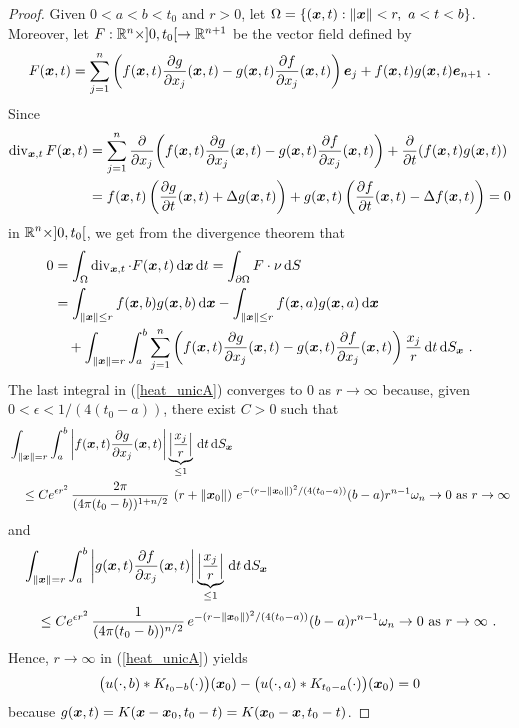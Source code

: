 \begin{proof}
Given $0< a < b < t_0$ and $r>0$, let
$\displaystyle \Omega =
\left\{ (\VEC{x},t) : \|\VEC{x}\| < r, \ a<t<b \right\}$.
Moreover, let $F:\RR^n \times ]0,t_0[ \to \RR^{n+1}$ be the vector
field defined by
\[
F(\VEC{x},t) = \sum_{j=1}^n
\left( f(\VEC{x},t) \pdydx{g}{x_j}(\VEC{x},t) - g(\VEC{x},t)
\pdydx{f}{x_j}(\VEC{x},t) \right) \VEC{e}_j
+ f(\VEC{x},t)g(\VEC{x},t) \VEC{e}_{n+1} \ .
\]
Since
\begin{align*}
\diV_{\VEC{x},t} F(\VEC{x},t)
&= \sum_{j=1}^n \pdfdx{
\left( f(\VEC{x},t) \pdydx{g}{x_j}(\VEC{x},t) - g(\VEC{x},t)
\pdydx{f}{x_j}(\VEC{x},t) \right) }{x_j}
+ \pdfdx{ \left(f(\VEC{x},t)g(\VEC{x},t)\right) }{t} \\
&= 
f(\VEC{x},t) \left( \pdydx{g}{t}(\VEC{x},t) + \Delta g(\VEC{x},t) \right)
+ g(\VEC{x},t) \left( \pdydx{f}{t}(\VEC{x},t) - \Delta f(\VEC{x},t) \right)
= 0
\end{align*}
in $\displaystyle \RR^n \times ]0,t_0[$, we get from the divergence theorem that
\begin{equation} \label{heat_unicA}
\begin{split}
0 &= \int_{\Omega} \diV_{\VEC{x},t}\cdot F(\VEC{x},t) \dx{\VEC{x}}\dx{t} 
= \int_{\partial \Omega} F \cdot \nu \dx{S} \\
&= \int_{\|\VEC{x}\|\leq r} f(\VEC{x},b)g(\VEC{x},b) \dx{\VEC{x}}
- \int_{\|\VEC{x}\|\leq r} f(\VEC{x},a)g(\VEC{x},a) \dx{\VEC{x}} \\
&\quad + \int_{\|\VEC{x}\|=r} \int_a^b
\sum_{j=1}^n \left( f(\VEC{x},t) \pdydx{g}{x_j}(\VEC{x},t) - g(\VEC{x},t)
\pdydx{f}{x_j}(\VEC{x},t) \right) \frac{x_j}{r} \dx{t}\dx{S_{\VEC{x}}} \ .
\end{split}
\end{equation}
The last integral in (\ref{heat_unicA}) converges to $0$ as
$r\to \infty$ because, given $0 < \epsilon < 1/(4(t_0-a))$, there
exist $C>0$ such that
\begin{align*}
&\int_{\|\VEC{x}\|=r} \int_a^b
\left| f(\VEC{x},t) \pdydx{g}{x_j}(\VEC{x},t) \right|
\underbrace{\left|\frac{x_j}{r}\right|}_{\leq 1} \dx{t}\dx{S_{\VEC{x}}} \\
& \quad
\leq C e^{\epsilon r^2}\, \frac{2\pi}{(4\pi (t_0-b))^{1+n/2}}
\, \left(r+\|\VEC{x}_0\|\right)
\, e^{-(r-\|\VEC{x}_0\|)^2/(4(t_0-a))} (b-a) r^{n-1} \omega_n \to 0 \
\text{as} \ r \to \infty
\end{align*}
and
\begin{align*}
&\int_{\|\VEC{x}\|=r} \int_a^b
\left| g(\VEC{x},t) \pdydx{f}{x_j}(\VEC{x},t) \right|
\underbrace{\left|\frac{x_j}{r}\right|}_{\leq 1} \dx{t}\dx{S_{\VEC{x}}} \\
& \quad
\leq C e^{\epsilon r^2}\, \frac{1}{(4\pi (t_0-b))^{n/2}}
\, e^{-(r-\|\VEC{x}_0\|)^2/(4(t_0-a))} (b-a) r^{n-1} \omega_n \to 0 \
\text{as} \ r \to \infty \ .
\end{align*}
Hence,
$r \to \infty$ in (\ref{heat_unicA}) yields
\begin{equation} \label{heat_unicB}
\big(u(\cdot, b) \ast K_{t_0-b}(\cdot)\big)(\VEC{x}_0)
- \big(u(\cdot, a) \ast K_{t_0-a}(\cdot)\big)(\VEC{x}_0) = 0
\end{equation}
because
$g(\VEC{x},t) = K(\VEC{x}-\VEC{x}_0, t_0-t) = K(\VEC{x}_0-\VEC{x}, t_0-t)$.


\end{proof}
